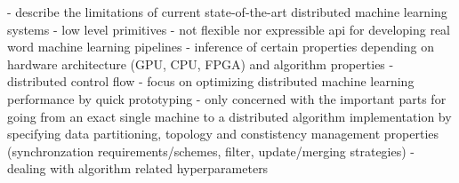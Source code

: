 - describe the limitations of current state-of-the-art distributed machine learning systems
	- low level primitives
	- not flexible nor expressible api for developing real word machine learning pipelines
	- inference of certain properties depending on hardware architecture (GPU, CPU, FPGA) and algorithm properties
	- distributed control flow
	- focus on optimizing distributed machine learning performance by quick prototyping
	- only concerned with the important parts for going from an exact single machine to a distributed algorithm implementation by specifying data partitioning, topology and constistency management properties (synchronzation requirements/schemes, filter, update/merging strategies)
	- dealing with algorithm related hyperparameters
